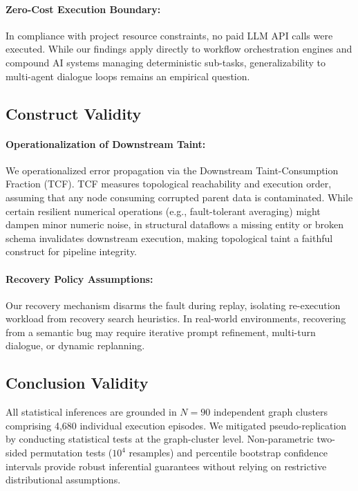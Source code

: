 \paragraph{Zero-Cost Execution Boundary:}
In compliance with project resource constraints, no paid LLM API calls were executed. While our findings apply directly to workflow orchestration engines and compound AI systems managing deterministic sub-tasks, generalizability to multi-agent dialogue loops remains an empirical question.

\subsection{Construct Validity}
\paragraph{Operationalization of Downstream Taint:}
We operationalized error propagation via the Downstream Taint-Consumption Fraction (TCF). TCF measures topological reachability and execution order, assuming that any node consuming corrupted parent data is contaminated. While certain resilient numerical operations (e.g., fault-tolerant averaging) might dampen minor numeric noise, in structural dataflows a missing entity or broken schema invalidates downstream execution, making topological taint a faithful construct for pipeline integrity.

\paragraph{Recovery Policy Assumptions:}
Our recovery mechanism disarms the fault during replay, isolating re-execution workload from recovery search heuristics. In real-world environments, recovering from a semantic bug may require iterative prompt refinement, multi-turn dialogue, or dynamic replanning.

\subsection{Conclusion Validity}
All statistical inferences are grounded in $N = 90$ independent graph clusters comprising 4,680 individual execution episodes. We mitigated pseudo-replication by conducting statistical tests at the graph-cluster level. Non-parametric two-sided permutation tests ($10^4$ resamples) and percentile bootstrap confidence intervals provide robust inferential guarantees without relying on restrictive distributional assumptions.
